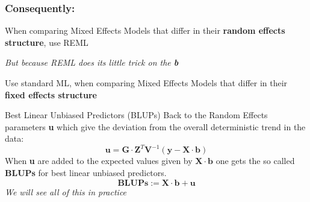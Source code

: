 \documentclass{beamer}
\newenvironment{VerbatimIN}
 {\VerbatimEnvironment
  \begin{tcolorbox}[
    breakable,
    colback=lightgray,
    spartan
  ]%
  \begin{Verbatim}}
 {\end{Verbatim}\end{tcolorbox}}
\newenvironment{VerbatimOUT}
 {\VerbatimEnvironment
  \begin{tcolorbox}[
    breakable,
    spartan
  ]%
  \begin{Verbatim}}
 {\end{Verbatim}\end{tcolorbox}}
\begin{document}

\begin{frame}
\frametitle{Consequently:}

\Large
When comparing Mixed Effects Models that differ in their \textbf{random effects structure}, use REML
\vspace{0.2cm}

\textit{But because REML does its little trick on the \textbf{b}}
\vspace{0.2cm}

Use standard ML, when comparing Mixed Effects Models that differ in their \textbf{fixed effects structure}
\end{frame}

\begin{frame}{Best Linear Unbiased Predictors (BLUPs)}
\large
Back to the Random Effects parameters \textbf{u} which give the deviation from the overall deterministic trend in the data:
\[
\mathbf{u} = \mathbf{G} \cdot \mathbf{Z}^T \mathbf{V}^{-1} (\mathbf{y} - \mathbf{X} \cdot \mathbf{b})
\]
When \textbf{u} are added to the expected values given by $\mathbf{X} \cdot \mathbf{b}$ one gets the so called \textbf{BLUPs} for best linear unbiased predictors.
\vspace{0.3cm}
\[
\mathbf{BLUPs} := \mathbf{X} \cdot \mathbf{b} + \mathbf{u}
\]
\vspace{0.3cm}
\textit{We will see all of this in practice}
\end{frame}
\end{document}
